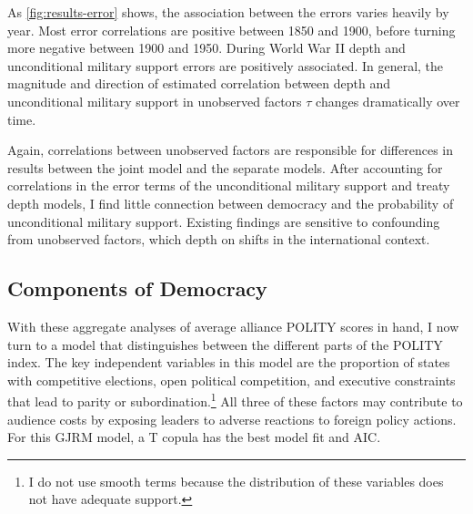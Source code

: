 \documentclass[12pt]{article}
\begin{document}
As \autoref{fig:results-error} shows, the association between the errors varies heavily by year. 
Most error correlations are positive between 1850 and 1900, before turning more negative between 1900 and 1950. 
During World War II depth and unconditional military support errors are positively associated. 
In general, the magnitude and direction of estimated correlation between depth and unconditional military support in unobserved factors $\tau$ changes dramatically over time.  


Again, correlations between unobserved factors are responsible for differences in results between the joint model and the separate models. 
After accounting for correlations in the error terms of the unconditional military support and treaty depth models, I find little connection between democracy and the probability of unconditional military support. 
Existing findings are sensitive to confounding from unobserved factors, which depth on shifts in the international context. 


\subsection{Components of Democracy}

With these aggregate analyses of average alliance POLITY scores in hand, I now turn to a model that distinguishes between the different parts of the POLITY index. 
The key independent variables in this model are the proportion of states with competitive elections, open political competition, and executive constraints that lead to parity or subordination.\footnote{I do not use smooth terms because the distribution of these variables does not have adequate support.}
All three of these factors may contribute to audience costs by exposing leaders to adverse reactions to foreign policy actions. 
For this GJRM model, a T copula has the best model fit and AIC. 
\end{document}
